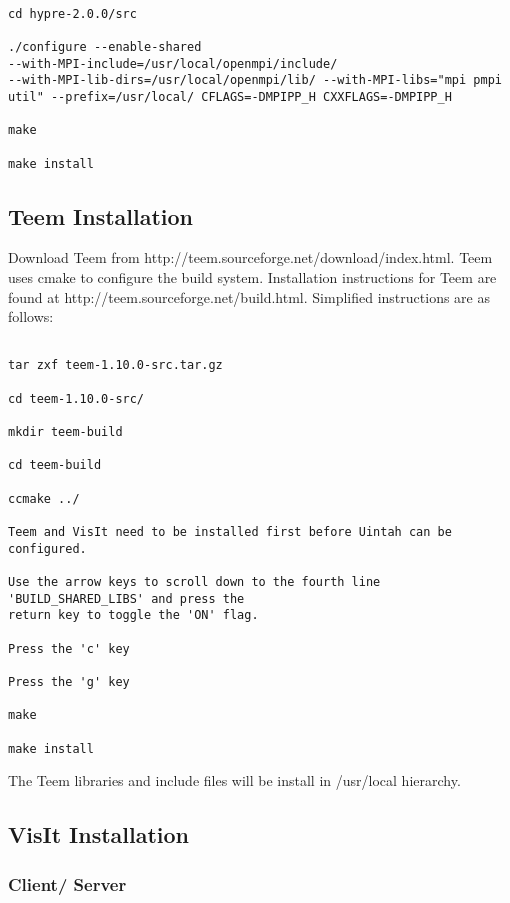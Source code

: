 \begin{Verbatim}

cd hypre-2.0.0/src

./configure --enable-shared
--with-MPI-include=/usr/local/openmpi/include/
--with-MPI-lib-dirs=/usr/local/openmpi/lib/ --with-MPI-libs="mpi pmpi
util" --prefix=/usr/local/ CFLAGS=-DMPIPP_H CXXFLAGS=-DMPIPP_H

make

make install

\end{Verbatim}

 

\subsection{Teem Installation}

Download Teem from http://teem.sourceforge.net/download/index.html.  Teem uses cmake to configure the build system. Installation instructions for Teem are found at http://teem.sourceforge.net/build.html.  Simplified instructions are as follows:

\begin{verbatim}

tar zxf teem-1.10.0-src.tar.gz

cd teem-1.10.0-src/

mkdir teem-build

cd teem-build

ccmake ../

Teem and VisIt need to be installed first before Uintah can be configured.

Use the arrow keys to scroll down to the fourth line 'BUILD_SHARED_LIBS' and press the 
return key to toggle the 'ON' flag.

Press the 'c' key

Press the 'g' key

make

make install

\end{verbatim}

The Teem libraries and include files will be install in /usr/local hierarchy.

\subsection{VisIt Installation}

\subsubsection{Client/ Server}
\label{sec:ClientServer}

